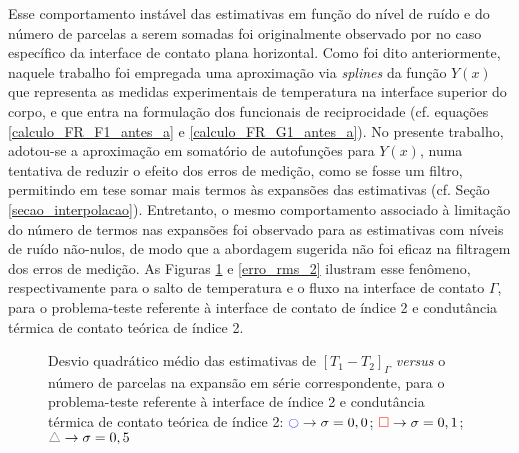 Esse comportamento instável das estimativas em função do nível de ruído e do número de parcelas a serem somadas foi originalmente observado por \cite{tese_padilha} no caso específico da interface de contato plana horizontal. Como foi dito anteriormente, naquele trabalho foi empregada uma aproximação via \textit{splines} da função $Y(x)$ que representa as medidas experimentais de temperatura na interface superior do corpo, e que entra na formulação dos funcionais de reciprocidade (cf. equações \eqref{calculo_FR_F1_antes_a} e \eqref{calculo_FR_G1_antes_a}). No presente trabalho, adotou-se a aproximação em somatório de autofunções para $Y(x)$, numa tentativa de reduzir o efeito dos erros de medição, como se fosse um filtro, permitindo em tese somar mais termos às expansões das estimativas (cf. Seção \ref{secao_interpolacao}). Entretanto, o mesmo comportamento associado à limitação do número de termos nas expansões foi observado para as estimativas com níveis de ruído não-nulos, de modo que a abordagem sugerida não foi eficaz na filtragem dos erros de medição. As Figuras \ref{erro_rms_1} e \ref{erro_rms_2} ilustram esse fenômeno, respectivamente para o salto de temperatura e o fluxo na interface de contato $\Gamma$, para o problema-teste referente à interface de contato de índice 2 e condutância térmica de contato teórica de índice 2.

\begin{figure}[H]
	\begin{minipage}[t][8cm][c]{\textwidth}
		\centering		
		\caption{Desvio quadrático médio das estimativas de $[T_1 - T_2]_\Gamma$ \textit{versus} o número de parcelas na expansão em série correspondente, para o problema-teste referente à interface de índice 2 e condutância térmica de contato teórica de índice 2: $\textcolor{blue}{\ocircle} \rightarrow \sigma = 0,0$; $\textcolor{red}{\square} \rightarrow \sigma = 0,1$; $\textcolor{gray}{\triangle} \rightarrow \sigma = 0,5$}
		\label{erro_rms_1}
	\end{minipage}
\end{figure}

